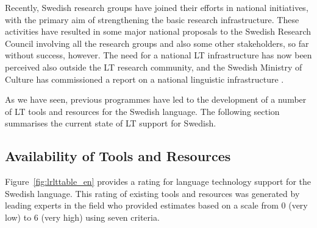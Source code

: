\begin{multicols}{2}
Recently, Swedish research groups have joined their efforts in
national initiatives, with the primary aim of strengthening the basic
research infrastructure. These activities have resulted in some major
national proposals to the Swedish Research Council involving all the
research groups and also some other stakeholders, so far without
success, however. The need for a national LT infrastructure has now
been perceived also outside the LT research community, and the Swedish
Ministry of Culture has commissioned a report on a national linguistic
infrastructure \cite{infrarapport}.

As we have seen, previous programmes have led to the development of a
number of LT tools and resources for the Swedish language. The
following section summarises the current state of LT support for
Swedish.
  
\subsection{Availability of Tools and Resources}
\label{section:LTavailability_en}

Figure~\ref{fig:lrlttable_en} provides a rating for language technology support for the Swedish language. This rating of existing tools and resources was generated by leading experts in the field who provided estimates based on a scale from 0 (very low) to 6 (very high) using seven criteria.


\end{multicols}
